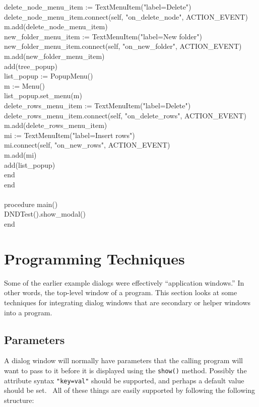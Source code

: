 {\>\>delete\_node\_menu\_item := TextMenuItem("label=Delete") \\
\>\>delete\_node\_menu\_item.connect(self, "on\_delete\_node", ACTION\_EVENT) \\
\>\>m.add(delete\_node\_menu\_item) \\
\>\>new\_folder\_menu\_item := TextMenuItem("label=New folder") \\
\>\>new\_folder\_menu\_item.connect(self, "on\_new\_folder", ACTION\_EVENT) \\
\>\>m.add(new\_folder\_menu\_item) \\
\>\>add(tree\_popup) \\
\>\>list\_popup := PopupMenu() \\
\>\>m := Menu() \\
\>\>list\_popup.set\_menu(m) \\
\>\>delete\_rows\_menu\_item := TextMenuItem("label=Delete") \\
\>\>delete\_rows\_menu\_item.connect(self, "on\_delete\_rows", ACTION\_EVENT) \\
\>\>m.add(delete\_rows\_menu\_item) \\
\>\>mi := TextMenuItem("label=Insert rows") \\
\>\>mi.connect(self, "on\_new\_rows", ACTION\_EVENT) \\
\>\>m.add(mi) \\
\>\>add(list\_popup) \\
\>end \\
end \\
\ \\
procedure main() \\
\>DNDTest().show\_modal() \\
end
}

\section{Programming Techniques}

Some of the earlier example dialogs were effectively
``application windows.'' In other words, the
top-level window of a program. This section looks at some techniques
for integrating dialog windows that are secondary or helper windows
into a program.

\subsection*{Parameters}

A dialog window will normally have parameters that the calling program will want
to pass to it before it is displayed using the \texttt{show()} method. Possibly
the attribute syntax \texttt{"key=val"} should be
supported, and perhaps a default value should be set. \ All of these things are
easily supported by following the following structure:

